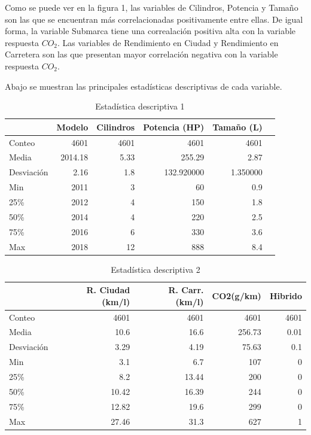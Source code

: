 \documentclass{article}
\begin{document}
Como se puede ver en la figura 1, las variables de Cilindros, Potencia y Tamaño son las que se encuentran más correlacionadas positivamente entre ellas. De igual forma, la variable Submarca tiene una correalación positiva alta con la variable respuesta $CO_2$. Las variables de Rendimiento en Ciudad y Rendimiento en Carretera son las que presentan mayor correlación negativa con la variable respuesta $CO_2$.

Abajo se muestran las principales estadísticas descriptivas de cada variable.

\begin{table}[ht]
    \begin{adjustbox}{max width=1\textwidth}
        \begin{tabular}{lrrrrr}
        \toprule
         & Modelo & Cilindros & Potencia (HP) & Tamaño (L)\\
        \midrule
        Conteo & 4601 & 4601 & 4601 & 4601\\
        Media & 2014.18 & 5.33 & 255.29 & 2.87\\
        Desviación & 2.16 & 1.8 & 132.920000 & 1.350000\\
        Min & 2011 & 3 & 60 & 0.9\\
        25\% & 2012 & 4 & 150 & 1.8\\
        50\% & 2014 & 4 & 220 & 2.5\\
        75\% & 2016 & 6 & 330 & 3.6\\
        Max & 2018 & 12 & 888 & 8.4\\
        \bottomrule
        \end{tabular}
    \end{adjustbox}
    \centering
    \caption{Estadística descriptiva 1}
    \label{table:tablas}
\end{table}

\begin{table}[ht]
    \begin{adjustbox}{max width=1\textwidth}
        \begin{tabular}{lrrrr}
        \toprule
         & R. Ciudad (km/l) & R. Carr. (km/l) & CO2(g/km) & Hibrido \\
        \midrule
        Conteo & 4601 & 4601 & 4601 & 4601 \\
        Media & 10.6 & 16.6 & 256.73 & 0.01 \\
        Desviación & 3.29 & 4.19 & 75.63 & 0.1 \\
        Min & 3.1 & 6.7 & 107 & 0 \\
        25\% & 8.2 & 13.44 & 200 & 0 \\
        50\% & 10.42 & 16.39 & 244 & 0 \\
        75\% & 12.82 & 19.6 & 299 & 0 \\
        Max & 27.46 & 31.3 & 627 & 1 \\
        \bottomrule
        \end{tabular}
    \end{adjustbox}
    \centering
    \caption{Estadística descriptiva 2}
    \label{table:tablas}
\end{table}
\end{document}
